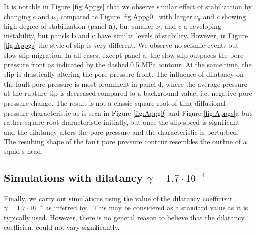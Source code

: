 \documentclass[draft]{agujournal2019}
\begin{document}
It is notable in Figure \ref{fig:Appgs} that we observe similar effect of stabilization by changing $c$ and $\nu_u$ compared to Figure \ref{fig:Appg0}, with larger $\nu_u$ and $c$ showing high degree of stabilization (panel {\bf a}), but smaller $\nu_u$ and $c$ a developing instability, but panels {\bf b} and {\bf c} have similar levels of stability. However, in Figure \ref{fig:Appgs} the style of slip is very different. We observe no seismic events but slow slip migration. In all cases, except panel a, the slow slip outpaces the pore pressure front as indicated by the dashed 0.5 MPa contour. At the same time, the slip is drastically altering the pore pressure front. The influence of dilatancy on the fault pore pressure is most prominent in panel d, where the average pressure at the rupture tip is decreased compared to a background value, i.e. negative pore pressure change. The result is not a classic square-root-of-time diffusional pressure characteristic as is seen in Figure \ref{fig:Appg0} and Figure \ref{fig:Appgs}a but rather square-root characteristic initially, but once the slip speed is significant and the dilatancy alters the pore pressure and the characteristic is perturbed. The resulting shape of the fault pore pressure contour resembles the outline of a squid's head.  


\subsection{Simulations with dilatancy $\gamma = 1.7 \cdot 10^{-4}$}

Finally, we carry out simulations using the value of the dilatancy coefficient $\gamma = 1.7 \cdot 10^{-4}$ as inferred by . This may be considered as a standard value as it is typically used. However, there is no general reason to believe that the dilatancy coefficient could not vary significantly. 
\end{document}

